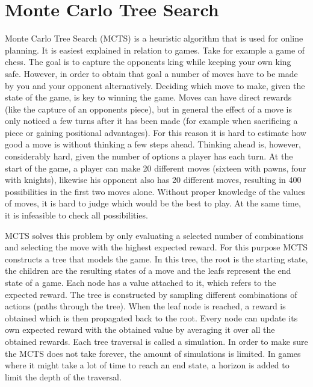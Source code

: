 \section{Monte Carlo Tree Search}

Monte Carlo Tree Search (MCTS) is a heuristic algorithm that is used for online planning. It is easiest explained in relation to games. Take for example a game of chess. The goal is to capture the opponents king while keeping your own king safe. However, in order to obtain that goal a number of moves have to be made by you and your opponent alternatively. Deciding which move to make, given the state of the game, is key to winning the game. Moves can have direct rewards (like the capture of an opponents piece), but in general the effect of a move is only noticed a few turns after it has been made (for example when sacrificing a piece or gaining positional advantages). For this reason it is hard to estimate how good a move is without thinking a few steps ahead. Thinking ahead is, however, considerably hard, given the number of options a player has each turn. At the start of the game, a player can make 20 different moves (sixteen with pawns, four with knights), likewise his opponent also has 20 different moves, resulting in 400 possibilities in the first two moves alone. Without proper knowledge of the values of moves, it is hard to judge which would be the best to play. At the same time, it is infeasible to check all possibilities. 

MCTS solves this problem by only evaluating a selected number of combinations and selecting the move with the highest expected reward. For this purpose MCTS constructs a tree that models the game. In this tree, the root is the starting state, the children are the resulting states of a move and the leafs represent the end state of a game. Each node has a value attached to it, which refers to the expected reward. The tree is constructed by sampling different combinations of actions (paths through the tree). When the leaf node is reached, a reward is obtained which is then propagated back to the root. Every node can update its own expected reward with the obtained value by averaging it over all the obtained rewards. Each tree traversal is called a simulation. In order to make sure the MCTS does not take forever, the amount of simulations is limited. In games where it might take a lot of time to reach an end state, a horizon is added to limit the depth of the traversal.  